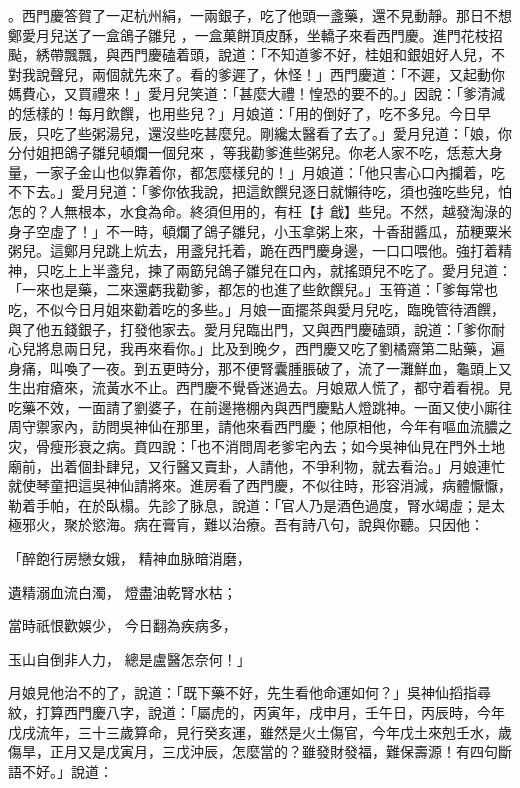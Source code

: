 \begin{showcontents}{}
。西門慶答賀了一疋杭州絹，一兩銀子，吃了他頭一盞藥，還不見動靜。那日不想鄭愛月兒送了一盒鴿子雛兒 ，一盒菓餅頂皮酥，坐轎子來看西門慶。進門花枝招颭，綉帶飄飄，與西門慶磕着頭，說道：「不知道爹不好，桂姐和銀姐好人兒，不對我說聲兒，兩個就先來了。看的爹遲了，休怪！」西門慶道：「不遲，又起動你媽費心，又買禮來！」愛月兒笑道：「甚麼大禮！惶恐的要不的。」因說：「爹清減的恁樣的！每月飲饌，也用些兒？」月娘道：「用的倒好了，吃不多兒。今日早辰，只吃了些粥湯兒，還沒些吃甚麼兒。剛纔太醫看了去了。」愛月兒道：「娘，你分付姐把鴿子雛兒頓爛一個兒來 ，等我勸爹進些粥兒。你老人家不吃，恁惹大身量，一家子金山也似靠着你，都怎麼樣兒的！」月娘道：「他只害心口內攔着，吃不下去。」愛月兒道：「爹你依我說，把這飲饌兒逐日就懶待吃，須也強吃些兒，怕怎的？人無根本，水食為命。終須但用的，有枉【扌戧】些兒。不然，越發淘淥的身子空虛了！」不一時，頓爛了鴿子雛兒，小玉拿粥上來，十香甜醬瓜，茄粳粟米粥兒。這鄭月兒跳上炕去，用盞兒托着，跪在西門慶身邊，一口口喂他。強打着精神，只吃上上半盞兒，揀了兩筯兒鴿子雛兒在口內，就搖頭兒不吃了。愛月兒道：「一來也是藥，二來還虧我勸爹，都怎的也進了些飲饌兒。」玉筲道：「爹每常也吃，不似今日月姐來勸着吃的多些。」月娘一面擺茶與愛月兒吃，臨晚管待酒饌，與了他五錢銀子，打發他家去。愛月兒臨出門，又與西門慶磕頭，說道：「爹你耐心兒將息兩日兒，我再來看你。」比及到晚夕，西門慶又吃了劉橘齋第二貼藥，遍身痛，叫喚了一夜。到五更時分，那不便腎囊腫脹破了，流了一灘鮮血，龜頭上又生出疳瘡來，流黃水不止。西門慶不覺昏迷過去。月娘眾人慌了，都守着看視。見吃藥不效，一面請了劉婆子，在前邊捲棚內與西門慶點人燈跳神。一面又使小廝往周守禦家內，訪問吳神仙在那里，請他來看西門慶；他原相他，今年有嘔血流膿之灾，骨瘦形衰之病。賁四說：「也不消問周老爹宅內去；如今吳神仙見在門外土地廟前，出着個卦肆兒，又行醫又賣卦，人請他，不爭利物，就去看治。」月娘連忙就使琴童把這吳神仙請將來。進房看了西門慶，不似往時，形容消減，病體懨懨，勒着手帕，在於臥榻。先診了脉息，說道：「官人乃是酒色過度，腎水竭虛；是太極邪火，聚於慾海。病在膏肓，難以治療。吾有詩八句，說與你聽。只因他：

「醉飽行房戀女娥，  精神血脉暗消磨，

遺精溺血流白濁，  燈盡油乾腎水枯；

當時祇恨歡娛少，  今日翻為疾病多，

玉山自倒非人力，  總是盧醫怎奈何！」

月娘見他治不的了，說道：「既下藥不好，先生看他命運如何？」吳神仙搯指尋紋，打算西門慶八字，說道：「屬虎的，丙寅年，戌申月，壬午日，丙辰時，今年戊戌流年，三十三歲算命，見行癸亥運，雖然是火土傷官，今年戊土來剋壬水，歲傷旱，正月又是戊寅月，三戊沖辰，怎麼當的？雖發財發福，難保壽源！有四句斷語不好。」說道：


\end{showcontents}
